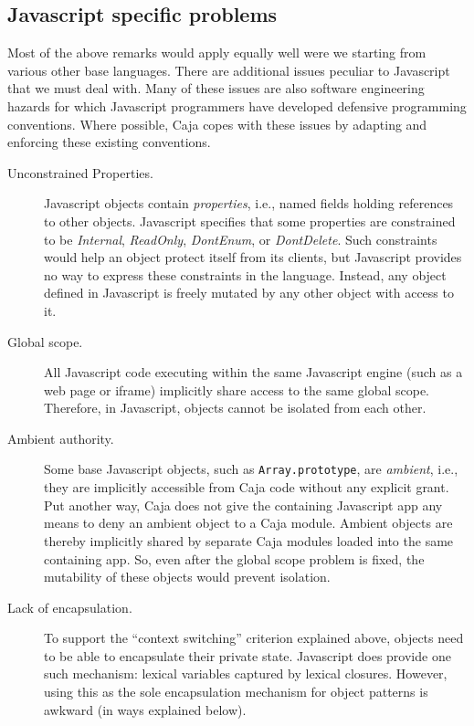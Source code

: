 \documentclass[letterpaper,twocolumn,10pt]{article}
\newcommand{\code}[1]{{\tt {#1}}}              %
\begin{document}
\subsection{Javascript specific problems}

Most of the above remarks would apply equally well were we starting from 
various other base languages. There are additional issues peculiar to 
Javascript that we must deal with. Many of these issues are also software 
engineering hazards for which Javascript programmers have developed 
defensive programming conventions. Where possible, Caja copes with these 
issues by adapting and enforcing these existing conventions.

\begin{description}

  \item[Unconstrained Properties.] Javascript objects contain 
  \emph{properties}, i.e., named fields holding references to other objects. 
  Javascript specifies that some properties are constrained to be 
  \emph{Internal}, \emph{ReadOnly}, \emph{DontEnum}, or \emph{DontDelete}. 
  Such constraints would help an object protect itself from its clients, but 
  Javascript provides no way to express these constraints in the language.
  Instead, any object defined in Javascript is freely mutated by any other
  object with access to it. 
  
  \item[Global scope.] All Javascript code executing within the same
  Javascript engine (such as a web page or iframe) implicitly share access to
  the same global scope. Therefore, in Javascript, objects cannot be isolated
  from each other.

  \item[Ambient authority.] Some base Javascript objects, such as 
  \code{Array.prototype}, are \emph{ambient}, i.e., they are implicitly 
  accessible from Caja code without any explicit grant. Put another way, 
  Caja does not give the containing Javascript app any means to deny an 
  ambient object to a Caja module. Ambient objects are thereby implicitly 
  shared by separate Caja modules loaded into the same containing app. So,
  even after the global scope problem is fixed, the mutability of these
  objects would prevent isolation.

  \item[Lack of encapsulation.] To support the ``context switching'' 
  criterion explained above, objects need to be able to encapsulate their
  private state. Javascript does provide one such mechanism: lexical variables
  captured by lexical closures. However, using this as the sole encapsulation
  mechanism for object patterns is awkward (in ways explained below).


\end{description}
\end{document}
